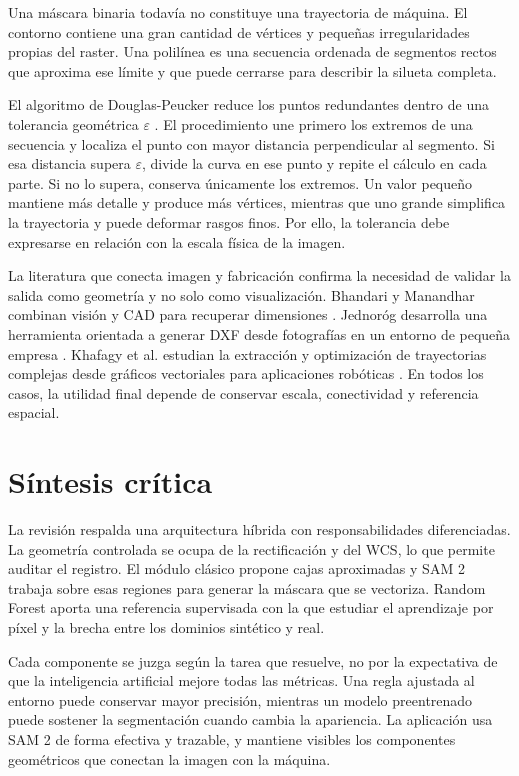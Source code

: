 Una máscara binaria todavía no constituye una trayectoria de máquina. El contorno contiene una gran cantidad de vértices y pequeñas irregularidades propias del raster. Una polilínea es una secuencia ordenada de segmentos rectos que aproxima ese límite y que puede cerrarse para describir la silueta completa.

El algoritmo de Douglas-Peucker reduce los puntos redundantes dentro de una tolerancia geométrica $\varepsilon$ \cite{DouglasPeucker1973}. El procedimiento une primero los extremos de una secuencia y localiza el punto con mayor distancia perpendicular al segmento. Si esa distancia supera $\varepsilon$, divide la curva en ese punto y repite el cálculo en cada parte. Si no lo supera, conserva únicamente los extremos. Un valor pequeño mantiene más detalle y produce más vértices, mientras que uno grande simplifica la trayectoria y puede deformar rasgos finos. Por ello, la tolerancia debe expresarse en relación con la escala física de la imagen.

La literatura que conecta imagen y fabricación confirma la necesidad de validar la salida como geometría y no solo como visualización. Bhandari y Manandhar combinan visión y CAD para recuperar dimensiones \cite{Bhandari2023}. Jednoróg desarrolla una herramienta orientada a generar DXF desde fotografías en un entorno de pequeña empresa \cite{Jednorg2025}. Khafagy et al. estudian la extracción y optimización de trayectorias complejas desde gráficos vectoriales para aplicaciones robóticas \cite{Khafagy2025}. En todos los casos, la utilidad final depende de conservar escala, conectividad y referencia espacial.

\section{Síntesis crítica}

La revisión respalda una arquitectura híbrida con responsabilidades diferenciadas. La geometría controlada se ocupa de la rectificación y del WCS, lo que permite auditar el registro. El módulo clásico propone cajas aproximadas y SAM 2 trabaja sobre esas regiones para generar la máscara que se vectoriza. Random Forest aporta una referencia supervisada con la que estudiar el aprendizaje por píxel y la brecha entre los dominios sintético y real.

Cada componente se juzga según la tarea que resuelve, no por la expectativa de que la inteligencia artificial mejore todas las métricas. Una regla ajustada al entorno puede conservar mayor precisión, mientras un modelo preentrenado puede sostener la segmentación cuando cambia la apariencia. La aplicación usa SAM 2 de forma efectiva y trazable, y mantiene visibles los componentes geométricos que conectan la imagen con la máquina.
